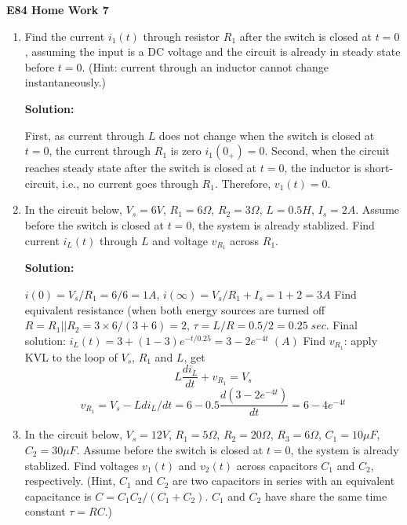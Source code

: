 \usepackage{html}

\begin{center}
{\Large \bf E84 Home Work 7}
\end{center}
\begin{enumerate}

\item Find the current $i_1(t)$ through resistor $R_1$ after the
switch is closed at $t=0$, assuming the input is a DC voltage and the
circuit is already in steady state before $t=0$.
(Hint: current through an inductor cannot change instantaneously.)


 {\bf Solution:}
 
 First, as current through $L$ does not change when the switch is
 closed at $t=0$, the current through $R_1$ is zero $i_1(0_+)=0$. 
 Second, when the circuit reaches steady state after the switch is
 closed at $t=0$, the inductor is short-circuit, i.e., no current
 goes through $R_1$. Therefore, $v_1(t)=0$.

\item In the circuit below, $V_s=6V$, $R_1=6\Omega$, $R_2=3\Omega$,
$L=0.5H$, $I_s=2A$. Assume before the switch is closed at $t=0$, the
system is already stablized. Find current $i_L(t)$ through $L$ and 
voltage $v_{R_1}$ across $R_1$.

 
 {\bf Solution:}
 
 $i(0)=V_s/R_1=6/6=1A$, $i(\infty)=V_s/R_1+I_s=1+2=3A$
  Find equivalent resistance (when both energy sources are turned off
  $R=R_1 || R_2=3\times 6/(3+6)=2$, $\tau=L/R=0.5/2=0.25\;sec.$
  Final solution:
  $i_L(t)=3+(1-3)e^{-t/0.25}=3-2 e^{-4t} \; (A)$
  Find $v_{R_1}$: apply KVL to the loop of $V_s$, $R_1$ and $L$, get
  \[ L\frac{di_L}{dt}+v_{R_1}=V_s	\]
  \[ v_{R_1}=V_s-L di_L/dt=6-0.5 \frac{d(3-2 e^{-4t})}{dt}=6-4e^{-4t}	\]

\item In the circuit below, $V_s=12V$, $R_1=5\Omega$, $R_2=20\Omega$,
$R_3=6\Omega$, $C_1=10\mu F$, $C_2=30\mu F$. Assume before the switch 
is closed at $t=0$, the system is already stablized. Find voltages
$v_1(t)$ and $v_2(t)$ across capacitors $C_1$ and $C_2$, respectively.
(Hint, $C_1$ and $C_2$ are two capacitors in series with an equivalent
capacitance is $C=C_1 C_2/(C_1+C_2)$. $C_1$ and $C_2$ have share the same
time constant $\tau=RC$.)



\end{enumerate}
